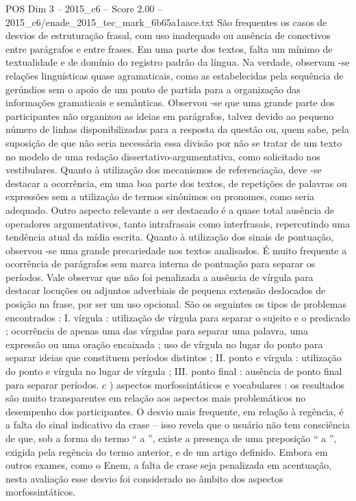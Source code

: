 \begin{textsample}{POS Dim 3 – 2015\_c6 – Score 2.00 – 2015\_c6/enade\_2015\_tec\_mark\_6b65a1aace.txt}
São frequentes os casos de desvios de estruturação frasal, com uso inadequado ou ausência de conectivos entre parágrafos e entre frases.
Em uma parte dos textos, falta um mínimo de textualidade e de domínio do registro padrão da língua.
Na verdade, observam -se relações linguísticas quase agramaticais, como as estabelecidas pela sequência de gerúndios sem o apoio de um ponto de partida para a organização das informações gramaticais e semânticas.
Observou -se que uma grande parte dos participantes não organizou as ideias em parágrafos, talvez devido ao pequeno número de linhas disponibilizadas para a resposta da questão ou, quem sabe, pela suposição de que não seria necessária essa divisão por não se tratar de um texto no modelo de uma redação dissertativo-argumentativa, como solicitado nos vestibulares.
Quanto à utilização dos mecanismos de referenciação, deve -se destacar a ocorrência, em uma boa parte dos textos, de repetições de palavras ou expressões sem a utilização de termos sinônimos ou pronomes, como seria adequado.
Outro aspecto relevante a ser destacado é a quase total ausência de operadores argumentativos, tanto intrafrasais como interfrasais, repercutindo uma tendência atual da mídia escrita.
Quanto à utilização dos sinais de pontuação, observou -se uma grande precariedade nos textos analisados.
É muito frequente a ocorrência de parágrafos sem marca interna de pontuação para separar os períodos.
Vale observar que não foi penalizada a ausência de vírgula para destacar locuções ou adjuntos adverbiais de pequena extensão deslocados de posição na frase, por ser um uso opcional.
São os seguintes os tipos de problemas encontrados : I. vírgula : utilização de vírgula para separar o sujeito e o predicado ; ocorrência de apenas uma das vírgulas para separar uma palavra, uma expressão ou uma oração encaixada ; uso de vírgula no lugar do ponto para separar ideias que constituem períodos distintos ; II. ponto e vírgula : utilização do ponto e vírgula no lugar de vírgula ; III. ponto final : ausência de ponto final para separar períodos. c ) aspectos morfossintáticos e vocabulares : os resultados são muito transparentes em relação aos aspectos mais problemáticos no desempenho dos participantes.
O desvio mais frequente, em relação à regência, é a falta do sinal indicativo da crase – isso revela que o usuário não tem consciência de que, sob a forma do termo “ a ”, existe a presença de uma preposição “ a ”, exigida pela regência do termo anterior, e de um artigo definido.
Embora em outros exames, como o Enem, a falta de crase seja penalizada em acentuação, nesta avaliação esse desvio foi considerado no âmbito dos aspectos morfossintáticos.

\end{textsample}
